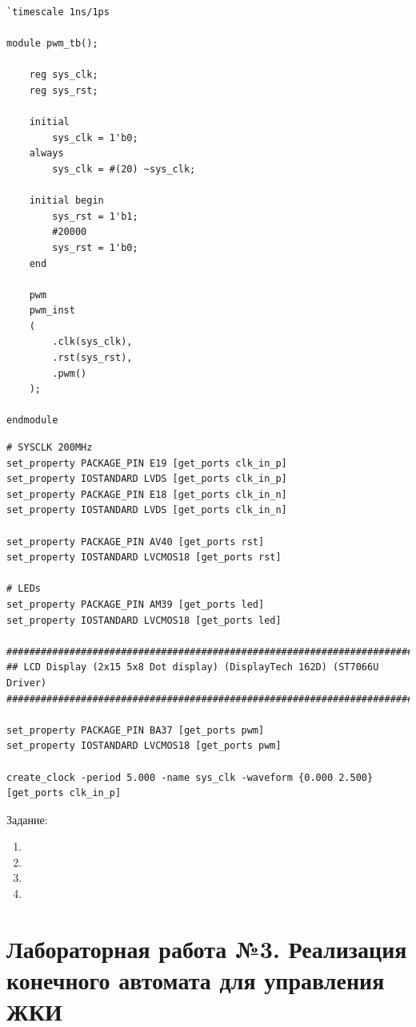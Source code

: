 \documentclass[a4paper,oneside ,10pt]{extreport}
\begin{document}
\begin{Verbatim}[tabsize=4]
`timescale 1ns/1ps

module pwm_tb();

    reg sys_clk;
    reg sys_rst;

    initial 
        sys_clk = 1'b0;
    always 
        sys_clk = #(20) ~sys_clk;

    initial begin
        sys_rst = 1'b1;
        #20000
        sys_rst = 1'b0;
    end

    pwm
    pwm_inst
    (
        .clk(sys_clk),
        .rst(sys_rst),
        .pwm()
    );

endmodule
\end{Verbatim}

\begin{Verbatim}[tabsize=4]
# SYSCLK 200MHz
set_property PACKAGE_PIN E19 [get_ports clk_in_p]
set_property IOSTANDARD LVDS [get_ports clk_in_p]
set_property PACKAGE_PIN E18 [get_ports clk_in_n]
set_property IOSTANDARD LVDS [get_ports clk_in_n]

set_property PACKAGE_PIN AV40 [get_ports rst]
set_property IOSTANDARD LVCMOS18 [get_ports rst]

# LEDs
set_property PACKAGE_PIN AM39 [get_ports led]
set_property IOSTANDARD LVCMOS18 [get_ports led]

#################################################################################
## LCD Display (2x15 5x8 Dot display) (DisplayTech 162D) (ST7066U Driver)
#################################################################################

set_property PACKAGE_PIN BA37 [get_ports pwm]
set_property IOSTANDARD LVCMOS18 [get_ports pwm]

create_clock -period 5.000 -name sys_clk -waveform {0.000 2.500} [get_ports clk_in_p]
\end{Verbatim}

\newpage

Задание:

\begin{enumerate}
	\item
	\item 
	\item 
	\item 
\end{enumerate}


\chapter{Лабораторная работа №3. Реализация конечного автомата для управления ЖКИ}
\end{document}
